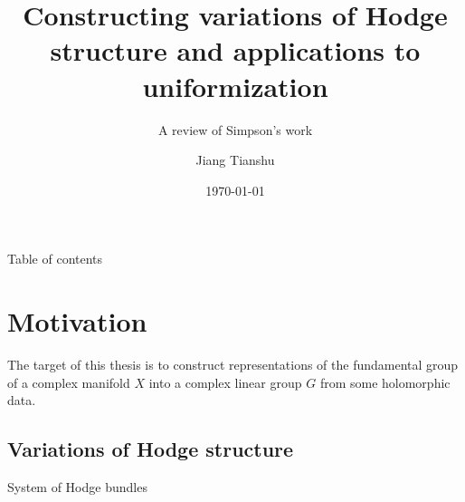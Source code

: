 \documentclass[aspectratio=169, 10pt]{beamer}
\title[]{Constructing variations of Hodge structure and applications to uniformization}
\subtitle{A review of Simpson's work}
\date[]{\today}
\author[]{Jiang Tianshu}
\institute{}
\theoremstyle{definition}
\theoremstyle{example}
\begin{document}
\maketitle

	\begin{frame}[toc]{Table of contents}%
		\tableofcontents%
	\end{frame}

\section{Motivation}
	\begin{frame}
		The target of this thesis is to construct representations of the fundamental group of a complex manifold $X$ into a complex linear group $G$ from some holomorphic data. 
	\end{frame}
	\subsection{Variations of Hodge structure}
		\begin{frame}
		\end{frame}
		\begin{frame}
		\end{frame}
		\begin{frame}{System of Hodge bundles}
		\end{frame}
\end{document}
